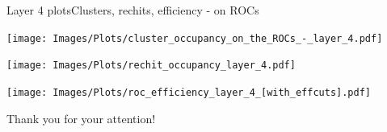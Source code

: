 \documentclass{beamer}
\begin{document}
\begin{frame}{Layer 4 plots}{Clusters, rechits, efficiency - on ROCs}
  \hspace{0.01\textwidth}%
  \begin{minipage}{0.32\textwidth}
    \centering
    \texttt{[image: Images/Plots/cluster\_occupancy\_on\_the\_ROCs\_-\_layer\_4.pdf]}
  \end{minipage}%
  \hspace{0.01\textwidth}%
  \begin{minipage}{0.32\textwidth}
    \centering
    \texttt{[image: Images/Plots/rechit\_occupancy\_layer\_4.pdf]}
  \end{minipage}%
  \vspace*{0.2cm}
  \hspace{0.01\textwidth}%
  \begin{minipage}{0.32\textwidth}
    \centering
    \texttt{[image: Images/Plots/roc\_efficiency\_layer\_4\_[with\_effcuts].pdf]}
  \end{minipage}
\end{frame}

\begin{frame}{}
    \vspace*{1.6cm}
    \hspace*{0.55cm}\huge Thank you for your attention!
\end{frame}

 
\end{document}
